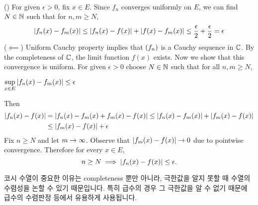 \pf\\
(\mimp) For given \(\epsilon > 0\), fix \(x \in E\). Since \(f_n\) converges uniformly on \(E\), we can find \(N \in \mathbb{N}\) such that for \(n, m \geq N\),
\[
    \left| f_n(x) - f_m(x) \right| \leq \left| f_n(x) - f(x) \right| + \left| f(x) - f_m(x) \right| \leq \frac{\epsilon}{2} + \frac{\epsilon}{2} = \epsilon
\]
(\(\impliedby\)) Uniform Cauchy property implies that \(\left( f_n \right)\) is a Cauchy sequence in \(\mathbb{C}\). By the completeness of \(\mathbb{C}\), the limit function \(f(x)\) exists. Now we show that this convergence is uniform.
For given \(\epsilon > 0\) choose \(N \in \mathbb{N}\) such that for all \(n, m \geq N\),
\begin{center}
    \(\displaystyle \sup_{x \in E} \left| f_n(x) - f_m(x) \right| \leq \epsilon\)
\end{center}
Then
\[
    \begin{aligned}
        \left| f_n(x) - f(x) \right| & = \left| f_n(x) - f_m(x) + f_m(x) - f(x) \right| \leq \left| f_n(x) - f_m(x) \right| + \left| f_m(x) - f(x) \right| \\
                            & \leq \left| f_m(x) - f(x) \right| + \epsilon
    \end{aligned}
\]
Fix \(n \geq N\) and let \(m \rightarrow \infty\). Observe that \(\left| f_m(x) - f(x) \right| \rightarrow 0\) due to pointwise convergence. Therefore for every \(x \in E\),
\[
    n \geq N \implies \left| f_n(x) - f(x) \right| \leq \epsilon.
\]

코시 수열이 중요한 이유는 completeness 뿐만 아니라, 극한값을 알지 못할 때 수열의 수렴성을 논할 수 있기 때문입니다. 특히 급수의 경우 그 극한값을 알 수 없기 때문에 급수의 수렴판정 등에서 유용하게 사용됩니다.

\pagebreak
